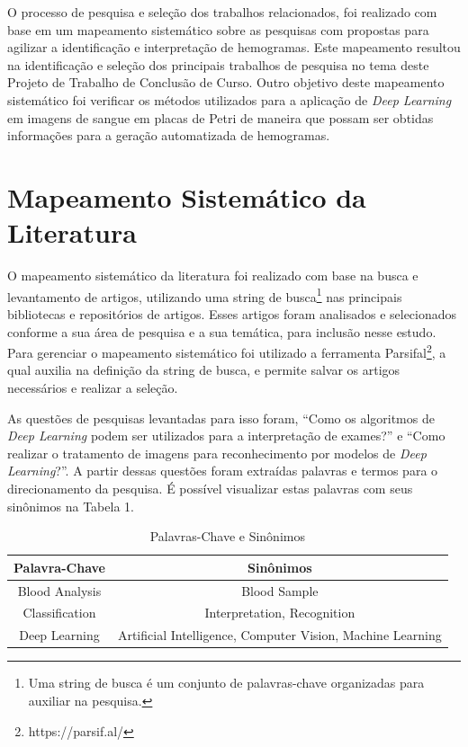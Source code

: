 O processo de pesquisa e seleção dos trabalhos relacionados, foi realizado com base em um mapeamento sistemático sobre as pesquisas com propostas para agilizar a identificação e interpretação de hemogramas. Este mapeamento resultou na identificação e seleção dos principais trabalhos de pesquisa no tema deste Projeto de Trabalho de Conclusão de Curso. Outro objetivo deste mapeamento sistemático foi verificar os métodos utilizados para a aplicação de \emph{Deep Learning} em imagens de sangue em placas de Petri de maneira que possam ser obtidas informações para a geração automatizada de hemogramas.

\section{Mapeamento Sistemático da Literatura}

O mapeamento sistemático da literatura foi realizado com base na busca e levantamento de artigos, utilizando uma string de busca\footnote[1]{Uma string de busca é um conjunto de palavras-chave organizadas para auxiliar na pesquisa.} nas principais bibliotecas e repositórios de artigos. Esses artigos foram analisados e selecionados conforme a sua área de pesquisa e a sua temática, para inclusão nesse estudo. Para gerenciar o mapeamento sistemático foi utilizado a ferramenta Parsifal\footnote[2]{https://parsif.al/}, a qual auxilia na definição da string de busca, e permite salvar os artigos necessários e realizar a seleção.

As questões de pesquisas levantadas para isso foram, ``Como os algoritmos de \emph{Deep Learning} podem ser utilizados para a interpretação de exames?'' e ``Como realizar o tratamento de imagens para reconhecimento por modelos de \emph{Deep Learning}?''. A partir dessas questões foram extraídas palavras e termos para o direcionamento da pesquisa. É possível visualizar estas palavras com seus sinônimos na Tabela 1.

\begin{table}[!htb]
	\centering
	\caption{Palavras-Chave e Sinônimos}
	\label{tbl:palavrasChave}
	\begin{tabular}{|c|c|}
		\hline
		\textbf{Palavra-Chave} & \textbf{Sinônimos}                                        \\ \hline
		Blood Analysis         & Blood Sample                                               \\ \hline
		Classification         & Interpretation, Recognition                                \\ \hline
		Deep Learning          & Artificial Intelligence, Computer Vision, Machine Learning \\ \hline
	\end{tabular}
	\vspace{6pt}
\end{table}

